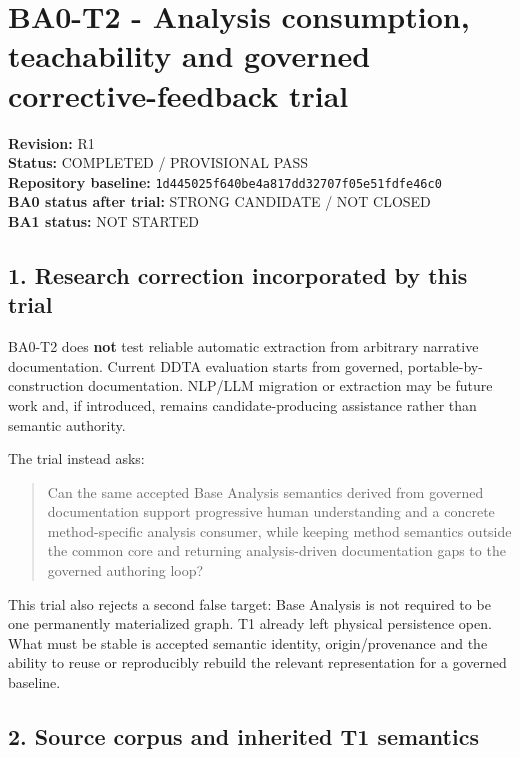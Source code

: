 \documentclass[
  10pt,
  a4paper,
]{article}
\author{}
\date{}
\begin{document}
\section{BA0-T2 - Analysis consumption, teachability and governed
corrective-feedback
trial}\label{ba0-t2---analysis-consumption-teachability-and-governed-corrective-feedback-trial}

\textbf{Revision:} R1\\
\textbf{Status:} COMPLETED / PROVISIONAL PASS\\
\textbf{Repository baseline:}
\texttt{1d445025f640be4a817dd32707f05e51fdfe46c0}\\
\textbf{BA0 status after trial:} STRONG CANDIDATE / NOT CLOSED\\
\textbf{BA1 status:} NOT STARTED

\subsection{1. Research correction incorporated by this
trial}\label{1-research-correction-incorporated-by-this-trial}

BA0-T2 does \textbf{not} test reliable automatic extraction from
arbitrary narrative documentation. Current DDTA evaluation starts from
governed, portable-by-construction documentation. NLP/LLM migration or
extraction may be future work and, if introduced, remains
candidate-producing assistance rather than semantic authority.

The trial instead asks:

\begin{quote}
Can the same accepted Base Analysis semantics derived from governed
documentation support progressive human understanding and a concrete
method-specific analysis consumer, while keeping method semantics
outside the common core and returning analysis-driven documentation gaps
to the governed authoring loop?
\end{quote}

This trial also rejects a second false target: Base Analysis is not
required to be one permanently materialized graph. T1 already left
physical persistence open. What must be stable is accepted semantic
identity, origin/provenance and the ability to reuse or reproducibly
rebuild the relevant representation for a governed baseline.

\subsection{2. Source corpus and inherited T1
semantics}\label{2-source-corpus-and-inherited-t1-semantics}
\end{document}
